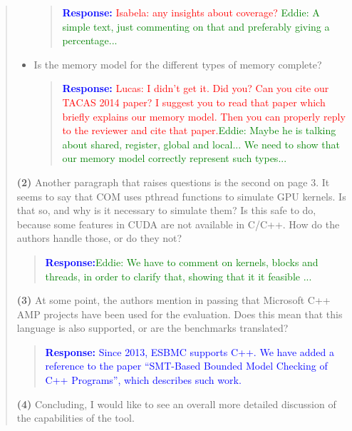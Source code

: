 \documentclass[11pt]{article}
\begin{document}
\begin{quote}
\begin{itemize}
  \begin{quote}
  \textcolor{blue}{\textbf{Response:} \textcolor{red}{Isabela: any insights about coverage?} \textcolor{green}{Eddie: A simple text, just commenting on that and preferably giving a percentage...}}
  \end{quote}
  
  \item Is the memory model for the different types of memory complete?
  
  \begin{quote}
  \textcolor{blue}{\textbf{Response:} \textcolor{red}{Lucas: I didn't get it. Did you? Can you cite our TACAS 2014 paper? I suggest you to read that paper which briefly explains our memory model. Then you can properly reply to the reviewer and cite that paper.}\textcolor{green}{Eddie: Maybe he is talking about shared, register, global and local... We need to show that our memory model correctly represent such types...}}
  \end{quote}
  
  \end{itemize}

{\bf (2)} Another paragraph that raises questions is the second on page 3. It seems to say that COM uses pthread functions to simulate GPU kernels. Is that so, and why is it necessary to simulate them? Is this safe to do, because some features in CUDA are not available in C/C++. How do the authors handle those, or do they not?

\begin{quote}
\textcolor{blue}{\textbf{Response:}\textcolor{green}{Eddie: We have to comment on kernels, blocks and threads, in order to clarify that, showing that it it feasible ...}}
\end{quote}

{\bf (3)} At some point, the authors mention in passing that Microsoft C++ AMP projects have been used for the evaluation. Does this mean that this language is also supported, or are the benchmarks translated?

\begin{quote}
\textcolor{blue}{\textbf{Response:} Since 2013, ESBMC supports C++. We have added a reference to the paper ``SMT-Based Bounded Model Checking of C++ Programs'', which describes such work.}
\end{quote}

{\bf (4)} Concluding, I would like to see an overall more detailed discussion of the capabilities of the tool.


\end{quote}
\end{document}
